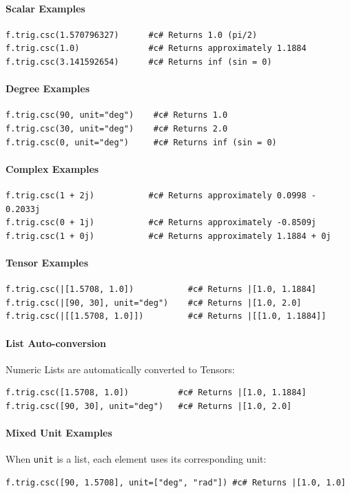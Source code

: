 \paragraph{Scalar Examples}
\begin{verbatim}
f.trig.csc(1.570796327)      #c# Returns 1.0 (pi/2)
f.trig.csc(1.0)              #c# Returns approximately 1.1884
f.trig.csc(3.141592654)      #c# Returns inf (sin = 0)
\end{verbatim}

\paragraph{Degree Examples}
\begin{verbatim}
f.trig.csc(90, unit="deg")    #c# Returns 1.0
f.trig.csc(30, unit="deg")    #c# Returns 2.0
f.trig.csc(0, unit="deg")     #c# Returns inf (sin = 0)
\end{verbatim}

\paragraph{Complex Examples}
\begin{verbatim}
f.trig.csc(1 + 2j)           #c# Returns approximately 0.0998 - 0.2033j
f.trig.csc(0 + 1j)           #c# Returns approximately -0.8509j
f.trig.csc(1 + 0j)           #c# Returns approximately 1.1884 + 0j
\end{verbatim}

\paragraph{Tensor Examples}
\begin{verbatim}
f.trig.csc(|[1.5708, 1.0])           #c# Returns |[1.0, 1.1884]
f.trig.csc(|[90, 30], unit="deg")    #c# Returns |[1.0, 2.0]
f.trig.csc(|[[1.5708, 1.0]])         #c# Returns |[[1.0, 1.1884]]
\end{verbatim}

\paragraph{List Auto-conversion}
Numeric Lists are automatically converted to Tensors:
\begin{verbatim}
f.trig.csc([1.5708, 1.0])          #c# Returns |[1.0, 1.1884]
f.trig.csc([90, 30], unit="deg")   #c# Returns |[1.0, 2.0]
\end{verbatim}

\paragraph{Mixed Unit Examples}
When \texttt{unit} is a list, each element uses its corresponding unit:
\begin{verbatim}
f.trig.csc([90, 1.5708], unit=["deg", "rad"]) #c# Returns |[1.0, 1.0]
\end{verbatim}


